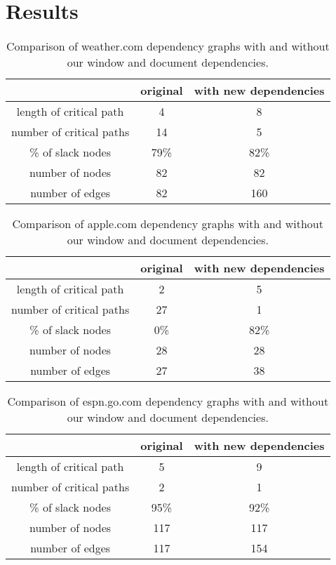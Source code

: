 \section{Results}

\begin{table*}[tb]
\centering
\small
\begin{tabular}{|c|c|c|}
\hline
 & original & with new dependencies \\
\hline
length of critical path & 4 & 8 \\
number of critical paths & 14 & 5 \\
\% of slack nodes & 79\% & 82\% \\
number of nodes & 82 & 82 \\
number of edges & 82 & 160 \\
\hline
\end{tabular}
\caption{Comparison of weather.com dependency graphs with and without our window and document dependencies.}
\label{t:weathergraph}
\end{table*}

\begin{table*}[tb]
\centering
\small
\begin{tabular}{|c|c|c|}
\hline
 & original & with new dependencies \\
\hline
length of critical path & 2 & 5 \\
number of critical paths & 27 & 1 \\
\% of slack nodes & 0\% & 82\% \\
number of nodes & 28 & 28 \\
number of edges & 27 & 38 \\
\hline
\end{tabular}
\caption{Comparison of apple.com dependency graphs with and without our window and document dependencies.}
\label{t:applegraph}
\end{table*}

\begin{table*}[tb]
\centering
\small
\begin{tabular}{|c|c|c|}
\hline
 & original & with new dependencies \\
\hline
length of critical path & 5 & 9 \\
number of critical paths & 2 & 1 \\
\% of slack nodes & 95\% & 92\% \\
number of nodes & 117 & 117 \\
number of edges & 117 & 154 \\
\hline
\end{tabular}\caption{Comparison of espn.go.com dependency graphs with and without our window and document dependencies.}
\label{t:espngraph}
\end{table*}

